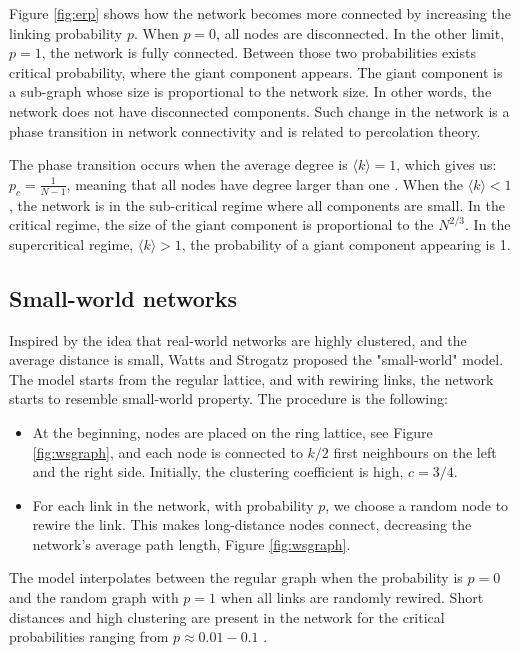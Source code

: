 Figure \ref{fig:erp} shows how the network becomes more connected by increasing the linking probability $p$. When $p=0$, all nodes are disconnected. In the other limit, $p=1$, the network is fully connected. Between those two probabilities exists critical probability, where the giant component appears. The giant component is a sub-graph whose size is proportional to the network size. In other words, the network does not have disconnected components. Such change in the network is a phase transition in network connectivity and is related to percolation theory. 

The phase transition occurs when the average degree is $ \langle k  \rangle = 1$, which gives us: $p_c = \frac{1}{N-1}$, meaning that all nodes have degree larger than one \cite{barabasi2016network}. When the $ \langle k  \rangle < 1$, the network is in the sub-critical regime where all components are small. In the critical regime, the size of the giant component is proportional to the $N^{2/3}$. In the supercritical regime, $ \langle k  \rangle > 1$, the probability of a giant component appearing is 1.

\subsection{Small-world networks}

Inspired by the idea that real-world networks are highly clustered, and the average distance is small, Watts and Strogatz \cite{watts1998collective} proposed the "small-world" model. The model starts from the regular lattice, and with rewiring links, the network starts to resemble small-world property. The procedure is the following:

\begin{itemize}
	\item At the beginning, nodes are placed on the ring lattice, see Figure \ref{fig:wsgraph}, and each node is connected to $k/2$ first neighbours on the left and the right side. Initially, the clustering coefficient is high, $c=3/4$. 
	\item For each link in the network, with probability $p$, we choose a random node to rewire the link. This makes long-distance nodes connect, decreasing the network's average path length, Figure \ref{fig:wsgraph}.
\end{itemize}

The model interpolates between the regular graph when the probability is $p=0$ and the random graph with $p=1$ when all links are randomly rewired. Short distances and high clustering are present in the network  for the critical probabilities ranging from $p \approx 0.01 - 0.1$ \cite{watts1998collective}. %

